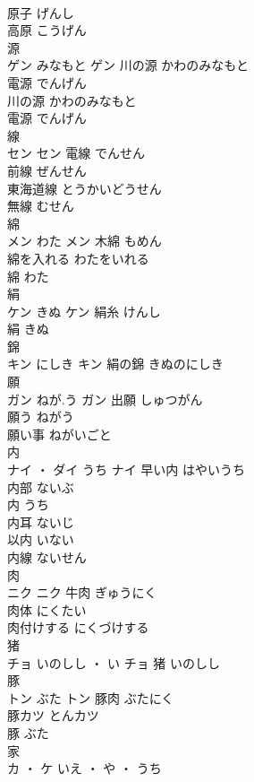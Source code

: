 \documentclass[8pt]{extreport}
\begin{document}
\begin{CJK}{UTF8}{min}
\\	原子	げんし	
\\	高原	こうげん	
\\	源	
\\	ゲン	みなもと	ゲン	川の源	かわのみなもと	
\\	電源	でんげん	
\\	川の源	かわのみなもと	
\\	電源	でんげん	
\\	線	
\\	セン		セン	電線	でんせん	
\\	前線	ぜんせん	
\\	東海道線	とうかいどうせん	
\\	無線	むせん	
\\	綿	
\\	メン	わた	メン	木綿	もめん	
\\	綿を入れる	わたをいれる	
\\	綿	わた	
\\	絹	
\\	ケン	きぬ	ケン	絹糸	けんし	
\\	絹	きぬ	
\\	錦	
\\	キン	にしき	キン													絹の錦	きぬのにしき	
\\	願	
\\	ガン	ねが.う	ガン	出願	しゅつがん	
\\	願う	ねがう	
\\	願い事	ねがいごと	
\\	内	
\\	ナイ ・ ダイ	うち	ナイ	早い内	はやいうち	
\\	内部	ないぶ	
\\	内	うち	
\\	内耳	ないじ	
\\	以内	いない	
\\	内線	ないせん	
\\	肉	
\\	ニク		ニク	牛肉	ぎゅうにく	
\\	肉体	にくたい	
\\	肉付けする	にくづけする	
\\	猪	
\\	チョ	いのしし ・ い	チョ													猪	いのしし	
\\	豚	
\\	トン	ぶた	トン	豚肉	ぶたにく	
\\	豚カツ	とんカツ	
\\	豚	ぶた	
\\	家	
\\	カ ・ ケ	いえ ・ や ・ うち

\end{CJK}
\end{document}
